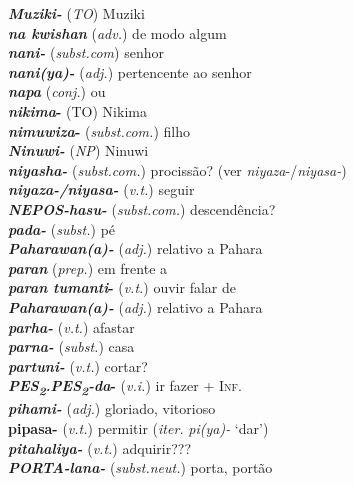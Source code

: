\begin{multicols}{2}
\begin{hangparas}{1em}{1}
		\textbf{\emph{Muziki-}} (\emph{TO}) \tabto{1em} Muziki\\
		\textbf{\emph{na kwishan}} (\emph{adv.}) \tabto{1em} de modo algum\\
		\textbf{\emph{nani-}} (\emph{subst.com}) \tabto{1em} senhor\\
		\textbf{\emph{nani(ya)-}} (\emph{adj.}) \tabto{1em} pertencente ao senhor\\
		\textbf{\emph{napa}} (\emph{conj.}) \tabto{1em} ou\\
		\textbf{\emph{nikima}-} (TO) \tabto{1em} Nikima\\
		\textbf{\emph{nimuwiza}-} (\emph{subst.com.}) \tabto{1em} filho\\
		\textbf{\emph{Ninuwi-}} (\emph{NP}) \tabto{1em} Ninuwi\\
		\textbf{\emph{niyasha-}} (\emph{subst.com.}) \tabto{1em} procissão? (ver \emph{niyaza}-/\emph{niyasa-})\\
		\textbf{\emph{niyaza-/niyasa-}} (\emph{v.t.}) \tabto{1em} seguir\\
		\textbf{\emph{\emph{NEPOS}-hasu-}} (\emph{subst.com.}) \tabto{1em} descendência?\\
		\textbf{\emph{pada-}} (\emph{subst.}) \tabto{1em} pé\\
		\textbf{\emph{Paharawan{(a)}-}} (\emph{adj.}) \tabto{1em} relativo a Pahara\\
		\textbf{\emph{paran}} (\emph{prep.}) \tabto{1em} em frente a\\
		\textbf{\emph{paran tumanti}-} (\emph{v.t.}) \tabto{1em} ouvir falar de\\
		\textbf{\emph{Paharawan{(a)}-}} (\emph{adj.}) \tabto{1em} relativo a Pahara\\
		\textbf{\emph{parha-}} (\emph{v.t.}) \tabto{1em} afastar\\
		\textbf{\emph{parna-}} (\emph{subst.}) \tabto{1em} casa\\
		\textbf{\emph{partuni-}} (\emph{v.t.}) \tabto{1em} cortar?\\
		\textbf{\emph{\emph{PES\textsubscript{2}.PES\textsubscript{2}}-da}-} (\emph{v.i.}) \tabto{1em} ir fazer + \textsc{Inf.}\\
		\textbf{\emph{pihami-}} (\emph{adj.}) \tabto{1em} gloriado, vitorioso\\
		\textbf{pipasa-} (\emph{v.t.}) \tabto{1em} permitir (\emph{iter.} \emph{pi{(ya)}-} `dar')\\
		\textbf{\emph{pitahaliya-}} (\emph{v.t.}) \tabto{1em} adquirir???\\
		\textbf{\emph{\emph{PORTA}-lana-}} (\emph{subst.neut.}) \tabto{1em} porta, portão\\

\end{hangparas}
\end{multicols}
